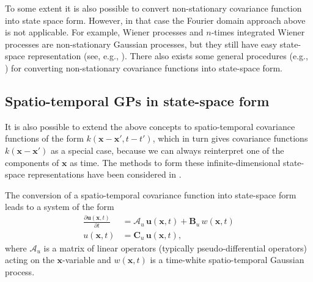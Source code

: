 \documentclass[journal]{IEEEtran}
\begin{document}
To some extent it is also possible to convert non-stationary covariance function into state space form. However, in that case the Fourier domain approach above is not applicable. For example, Wiener processes and $n$-times integrated Wiener processes are non-stationary Gaussian processes, but they still have easy state-space representation (see, e.g., \cite{Solin:2016}). There also exists some general procedures (e.g., \cite{Anderson:1969,Van-Trees:1971}) for converting non-stationary covariance functions into state-space form.

\subsection{Spatio-temporal GPs in state-space form}

It is also possible to extend the above concepts to spatio-temporal covariance functions of the form $k(\mathbf{x} - \mathbf{x}', t-t')$, which in turn gives covariance functions $k(\mathbf{x} - \mathbf{x}')$ as a special case, because we can always reinterpret one of the components of $\mathbf{x}$ as time. The methods to form these infinite-dimensional state-space representations have been considered in \cite{Sarkka+Hartikainen:2012,Sarkka+Solin+Hartikainen:2013}. 

The conversion of a spatio-temporal covariance function into state-space form leads to a system of the form
%
\begin{equation}
\begin{split}
  \frac{\partial\mathbf{u}(\mathbf{x},t)}{\partial t} &= \mathbf{\mathcal{A}}_u \, \mathbf{u}(\mathbf{x},t)
  + \mathbf{B}_u \, w(\mathbf{x},t) \\
   u(\mathbf{x},t) &= \mathbf{C}_u \, \mathbf{u}(\mathbf{x},t),
\end{split}
\label{eq:ssu2}
\end{equation}
%
where $\mathbf{\mathcal{A}}_u$ is a matrix of linear operators (typically pseudo-differential operators) acting on the $\mathbf{x}$-variable and $w(\mathbf{x},t)$ is a time-white spatio-temporal Gaussian process.
\end{document}
